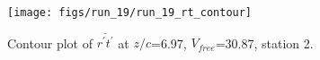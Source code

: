 \begin{figure}[H]
\centering
\texttt{[image: figs/run\_19/run\_19\_rt\_contour]}
\caption{Contour plot of $\overline{r^\prime t^\prime}$ at $z/c$=6.97, $V_{free}$=30.87, station 2.}
\label{fig:run_19_rt_contour}
\end{figure}


